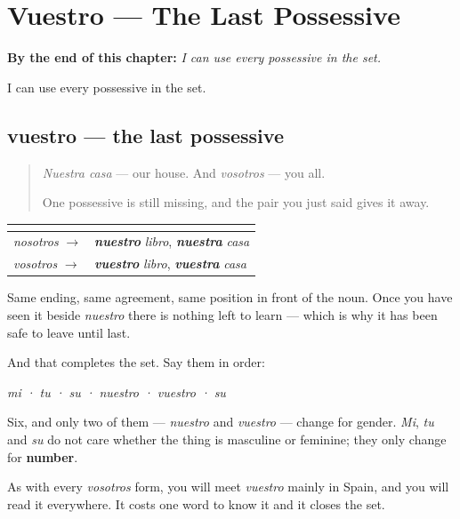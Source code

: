 
\chapter{Vuestro --- The Last Possessive}
\label{ch:vuestro}

\begin{chapteropening}
\textbf{By the end of this chapter:} \emph{I can use every possessive in the set.}

I can use every possessive in the set.
\end{chapteropening}

\section[vuestro]{vuestro — the last possessive}

\label{lesson:ES-C65-vuestro}



\begin{quote}
\emph{Nuestra casa} — our house. And \emph{vosotros} — you all.

One possessive is still missing, and the pair you just said gives it away.
\end{quote}

\begin{grammarlens}[title={Grammar Lens: the pair}]
\noindent
\begin{tabularx}{\linewidth}{@{}>{\raggedright\arraybackslash}X>{\raggedright\arraybackslash}X@{}}
\toprule
\textbf{} & \textbf{} \\
\midrule
\emph{nosotros} $\to$ & \emph{\textbf{nuestro}} \emph{libro}, \emph{\textbf{nuestra}} \emph{casa} \\
\emph{vosotros} $\to$ & \emph{\textbf{vuestro}} \emph{libro}, \emph{\textbf{vuestra}} \emph{casa} \\
\bottomrule
\end{tabularx}

Same ending, same agreement, same position in front of the noun. Once you have seen it beside \emph{nuestro} there is nothing left to learn — which is why it has been safe to leave until last.
\end{grammarlens}

\begin{culture}
And that completes the set. Say them in order:

\emph{mi · tu · su · nuestro · vuestro · su}

Six, and only two of them — \emph{nuestro} and \emph{vuestro} — change for gender. \emph{Mi}, \emph{tu} and \emph{su} do not care whether the thing is masculine or feminine; they only change for \textbf{number}.

As with every \emph{vosotros} form, you will meet \emph{vuestro} mainly in Spain, and you will read it everywhere. It costs one word to know it and it closes the set.
\end{culture}

